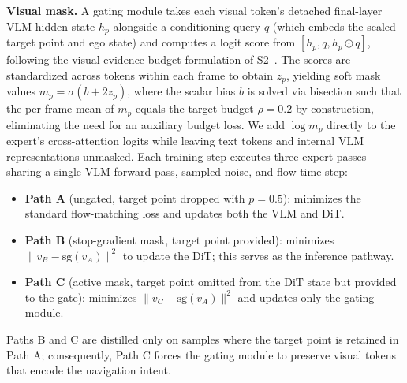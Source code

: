 \documentclass{article}
\begin{document}
\textbf{Visual mask.} A gating module takes each visual token's detached final-layer VLM hidden state $h_p$ alongside a conditioning query $q$ (which embeds the scaled target point and ego state) and computes a logit score from $[h_p, q, h_p\odot q]$, following the visual evidence budget formulation of S2~\cite{seeless}. The scores are standardized across tokens within each frame to obtain $z_p$, yielding soft mask values $m_p=\sigma(b+2z_p)$, where the scalar bias $b$ is solved via bisection such that the per-frame mean of $m_p$ equals the target budget $\rho=0.2$ by construction, eliminating the need for an auxiliary budget loss. We add $\log m_p$ directly to the expert's cross-attention logits while leaving text tokens and internal VLM representations unmasked. Each training step executes three expert passes sharing a single VLM forward pass, sampled noise, and flow time step:
\vspace{-5pt}
\begin{itemize}\setlength\itemsep{0pt}\setlength\parskip{0pt}\setlength\parsep{0pt}
\item \textbf{Path A} (ungated, target point dropped with $p=0.5$): minimizes the standard flow-matching loss and updates both the VLM and DiT.
\item \textbf{Path B} (stop-gradient mask, target point provided): minimizes $\lVert v_B-\mathrm{sg}(v_A)\rVert^2$ to update the DiT; this serves as the inference pathway.
\item \textbf{Path C} (active mask, target point omitted from the DiT state but provided to the gate): minimizes $\lVert v_C-\mathrm{sg}(v_A)\rVert^2$ and updates only the gating module.
\end{itemize}
\vspace{-5pt}
Paths B and C are distilled only on samples where the target point is retained in Path A; consequently, Path C forces the gating module to preserve visual tokens that encode the navigation intent.
\end{document}
